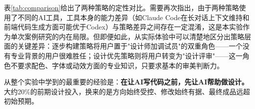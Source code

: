 表\ref{tab:comparison}给出了两种策略的定性对比。需要再次指出，由于两种策略使用了不同的AI工具，工具本身的能力差异（如Claude Code在长对话上下文维持和前端代码生成方面可能优于Codex）与策略差异之间存在一定混淆，这是本实验作为单次案例研究的内在局限。但即便如此，从实际体验中可以清楚地区分出策略层面的关键差异：逐步构建策略将用户置于"设计师加调试员"的双重角色——一个没有专业背景的用户很难胜任；设计优先策略则将用户转变为"设计评审"——这一角色不要求配色、字体或动效方面的专业知识，只要求基本的审美判断力。

从整个实验中学到的最重要的经验是：\textbf{在让AI写代码之前，先让AI帮助做设计。}大约20\%的前期设计投入，换来的是方向始终受控、修改始终有据、最终成品远超初始预期。
